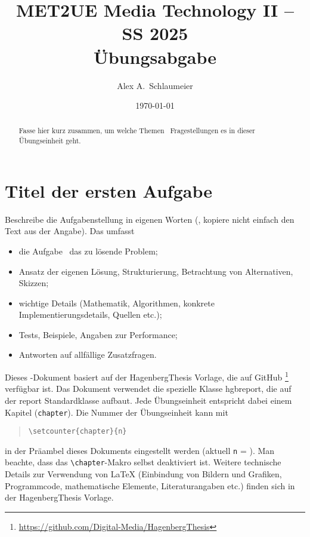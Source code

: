 \documentclass[german,notitlepage,smartquotes]{hgbreport}
\renewcommand{\chapter}[1]{} %
\begin{document}

\author{Alex A.\ Schlaumeier}                  %
\title{MET2UE Media Technology II -- SS 2025\\ %
				Übungsabgabe }
\date{\today}

\maketitle

\begin{abstract}\noindent
Fasse hier kurz zusammen, um welche Themen \bzw\ Fragestellungen es in dieser
Übungseinheit geht.
\end{abstract}


\section{Titel der ersten Aufgabe}

Beschreibe die Aufgabenstellung in eigenen Worten 
(\dah, kopiere nicht einfach den Text aus der Angabe).
Das umfasst \ia 
%
\begin{itemize}
	\item die Aufgabe \bzw\ das zu lösende Problem;
	\item Ansatz der eigenen Lösung, Strukturierung, Betrachtung von
	Alternativen, Skizzen;
	\item wichtige Details (Mathematik, Algorithmen, konkrete
	Implementierungsdetails, Quellen \cite{Sedgewick2011} %
	etc.);
	\item Tests, Beispiele, Angaben zur Performance;
	\item Antworten auf allfällige Zusatzfragen.
\end{itemize}

Dieses \latex-Dokument basiert auf der \textsf{HagenbergThesis} Vorlage, die
auf GitHub%
\footnote{\url{https://github.com/Digital-Media/HagenbergThesis}}
verfügbar ist. Das Dokument verwendet die spezielle Klasse \textsf{hgbreport},
die auf der \textsf{report} Standardklasse aufbaut. Jede Übungseinheit
entspricht dabei einem Kapitel (\texttt{chapter}). Die Nummer der Übungseinheit
kann mit
%
\begin{quote}
\verb!\setcounter{chapter}{n}!
\end{quote}
%
in der Präambel dieses Dokuments eingestellt werden (aktuell \texttt{n} =
). Man beachte, dass das \verb!\chapter!-Makro selbst
deaktiviert ist. Weitere technische Details zur Verwendung von LaTeX
(Einbindung von Bildern und Grafiken, Programmcode, mathematische Elemente,
Literaturangaben etc.) finden sich in der \textsf{HagenbergThesis} Vorlage.
\end{document}
